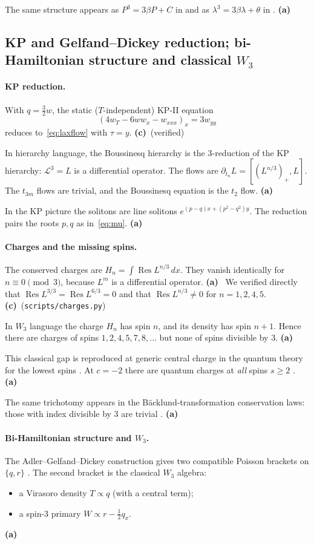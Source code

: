 \documentclass[11pt,a4paper]{article}
\newcommand{\La}{\textsf{\textbf{(a)}}}
\newcommand{\Lc}{\textsf{\textbf{(c)}}}
\newcommand{\script}[1]{\texttt{scripts/#1}}
\newcommand{\Res}{\operatorname{Res}}
\theoremstyle{remark}
\begin{document}
The same structure appears as $P^3=3\beta P+C$ in \cite[(2.8)]{DMHC} and as $\lambda^3=3\beta\lambda+\theta$ in \cite[§3]{RS}. \La

\subsection{KP and Gelfand--Dickey reduction; bi-Hamiltonian structure and classical $W_3$}\label{sec:w3}

\paragraph{KP reduction.} With $q=\tfrac32w$, the static ($T$-independent) KP-II equation
\[
(4w_T-6ww_x-w_{xxx})_x=3w_{yy}
\]
reduces to~\eqref{eq:laxflow} with $\tau=y$. \Lc\ (verified)

In hierarchy language, the Boussinesq hierarchy is the 3-reduction of the KP hierarchy: $\mathcal L^3=L$ is a differential operator. The flows are $\partial_{t_n}L=[(L^{n/3})_+,L]$. The $t_{3m}$ flows are trivial, and the Boussinesq equation is the $t_2$ flow. \La~\cite{Dickey}

In the KP picture the solitons are line solitons $e^{(p-q)x+(p^2-q^2)y}$. The reduction pairs the roots $p,q$ as in~\eqref{eq:mu}. \La~\cite{DMHC}

\paragraph{Charges and the missing spins.} The conserved charges are $H_n=\int\Res L^{n/3}\,dx$. They vanish identically for $n\equiv0\pmod3$, because $L^{m}$ is a differential operator. \La~\cite{Dickey} We verified directly that $\Res L^{3/3}=\Res L^{6/3}=0$ and that $\Res L^{n/3}\neq0$ for $n=1,2,4,5$. \Lc\ (\script{charges.py})

In $W_3$ language the charge $H_n$ has spin $n$, and its density has spin $n+1$. Hence there are charges of spins $1,2,4,5,7,8,\dots$ but none of spins divisible by 3. \La

This classical gap is reproduced at generic central charge in the quantum theory for the lowest spins \cite{KM}. At $c=-2$ there are quantum charges at \emph{all} spins $s\ge2$ \cite{Bordner}. \La

The same trichotomy appears in the Bäcklund-transformation conservation laws: those with index divisible by 3 are trivial \cite[eqs.\,(29)--(30)]{RS}. \La

\paragraph{Bi-Hamiltonian structure and $W_3$.} The Adler--Gelfand--Dickey construction gives two compatible Poisson brackets on $\{q,r\}$ \cite{Adler,Dickey}. The second bracket is the classical $W_3$ algebra:
\begin{itemize}
\item a Virasoro density $T\propto q$ (with a central term);
\item a spin-3 primary $W\propto r-\tfrac12q_x$.
\end{itemize}
\La~\cite{Mathieu88,MathieuOevel,BS}
\end{document}
